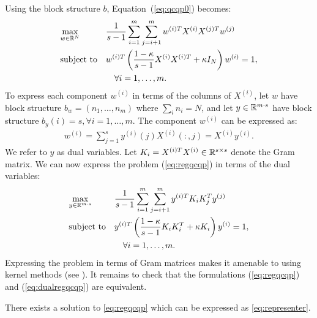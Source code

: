 Using the block structure $b$, Equation~(\ref{eq:qcqp0}) becomes:
 \begin{equation}\label{eq:regqcqp}
\begin{aligned}
& \underset{w \in \mathbb{R}^N}{\text{max}}
& & \frac{1}{s -1} \sum_{i = 1}^m \sum_{j = i+1}^m w^{(i)T} X^{(i)}X^{(j)T} w^{(j)} \\
& \text{subject to}
& & w^{(i)T} \left(\frac{1- \kappa}{s - 1}X^{(i)} X^{(i)T} + \kappa  I_N\right) w^{(i)} = 1,\\&&& \quad\forall i = 1,\ldots, m.
\end{aligned}
\end{equation}
To express each component $w^{(i)}$ in terms of the columns of $X^{(i)}$,
let $w$ have block structure $b_w = \left(n_1, \ldots, n_m\right)$
where $\sum_i n_i = N$, and let $y \in \mathbb{R}^{m\cdot s}$ have block
structure $b_y\left(i\right) = s, \forall i = 1,\ldots, m$. The
component $w^{(i)}$ can be expressed as:
\begin{equation}\label{eq:representer}
\begin{aligned}
w^{(i)} = \sum_{j = 1}^{s} y^{(i)}\left(j\right) X^{(i)}\left(:,j\right) = X^{(i)} y^{(i)}.
\end{aligned}
\end{equation}
We refer to $y$ as dual variables. Let $K_i = X^{(i)T} X^{(i)} \in \mathbb{R}^{s \times s}$ denote the Gram
matrix. We can now express the problem (\ref{eq:regqcqp}) in terms of the dual variables:
 \begin{equation}\label{eq:dualregqcqp}
\begin{aligned}
& \underset{y \in \mathbb{R}^{m\cdot s}}{\text{max}}
& & \frac{1}{s -1} \sum_{i = 1}^m \sum_{j = i+1}^m y^{(i)T} K_i K_j^T y^{(j)} \\
& \text{subject to}
& & y^{(i)T} \left(\frac{1- \kappa}{s - 1}K_i K_i^T + \kappa  K_i\right) y^{(i)} = 1,\\
& &&\quad\forall i = 1,\ldots, m.
\end{aligned}
\end{equation}
Expressing the problem in terms of Gram matrices makes it amenable to using kernel methods (see \cite{shawe-taylor04kernel}).
It remains to check that the formulations (\ref{eq:regqcqp}) and (\ref{eq:dualregqcqp})
are equivalent.
\begin{lemma}
There exists a solution to \eqref{eq:regqcqp} which can be expressed as \eqref{eq:representer}.
\end{lemma}
